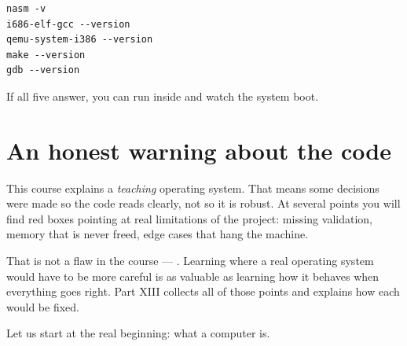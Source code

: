 \begin{tryit}
\begin{lstlisting}[style=sh]
nasm -v
i686-elf-gcc --version
qemu-system-i386 --version
make --version
gdb --version
\end{lstlisting}
If all five answer, you can run  inside  and watch the system
boot.
\end{tryit}

\section*{An honest warning about the code}

This course explains a \emph{teaching} operating system. That means some decisions were made so
the code reads clearly, not so it is robust. At several points you will find red boxes pointing
at real limitations of the project: missing validation, memory that is never freed, edge cases
that hang the machine.

That is not a flaw in the course --- . Learning where a real
operating system would have to be more careful is as valuable as learning how it behaves when
everything goes right. Part XIII collects all of those points and explains how each would be
fixed.

\sectionbreak
Let us start at the real beginning: what a computer is.
